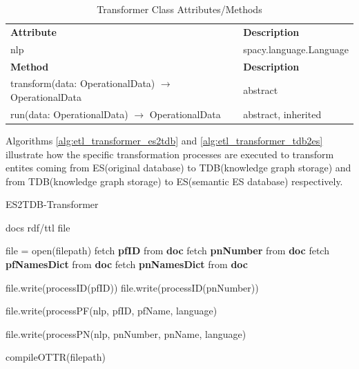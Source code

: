 \begin{table}[H]
	\centering
	\begin{tabular}{|p{}|p{}|}
		\hline
		\textbf{Attribute} & \textbf{Description} \\ 
		nlp & spacy.language.Language \\
		\hline
		\hline
		\textbf{Method} & \textbf{Description} \\ 
		\hline
		transform(data: OperationalData) $\rightarrow$ OperationalData & abstract \\
		\hline
		run(data: OperationalData) $\rightarrow$ OperationalData & abstract, inherited \\
		\hline
	\end{tabular}
	\caption{Transformer Class Attributes/Methods}
	\label{tab:class_attr_transformer}
\end{table}

Algorithms \ref{alg:etl_transformer_es2tdb} and \ref{alg:etl_transformer_tdb2es} illustrate how 
the specific transformation processes are executed to transform entites coming from ES(original 
database) to TDB(knowledge graph storage) and from TDB(knowledge graph storage) to ES(semantic ES 
database) respectively.

\begin{algorithm}
\caption{ES2TDB-Transformer}\label{alg:etl_transformer_es2tdb}
\begin{algorithmic}
\Require docs
\Ensure rdf/ttl file

\State file = open(filepath)
	\State fetch \textbf{pfID} from \textbf{doc}
	\State fetch \textbf{pnNumber} from \textbf{doc}
	\State fetch \textbf{pfNamesDict} from \textbf{doc}
	\State fetch \textbf{pnNamesDict} from \textbf{doc}

	\State file.write(processID(pfID))	
	\State file.write(processID(pnNumber))
\end{algorithmic}
\end{algorithm}

\begin{algorithm}
\begin{algorithmic}
	\State file.write(processPF(nlp, pfID, pfName, language)	
	\EndFor

	\State file.write(processPN(nlp, pnNumber, pnName, language) 	
	\EndFor
\EndFor

\State compileOTTR(filepath)	
\end{algorithmic}
\end{algorithm}

